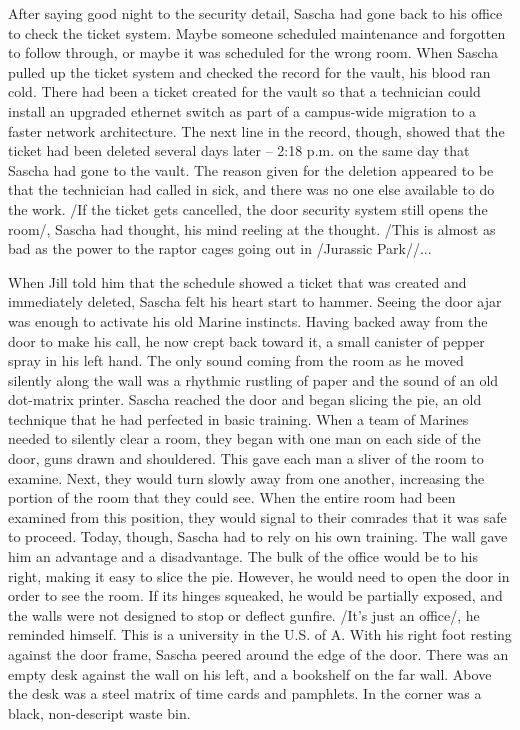 After saying good night to the security detail, Sascha had gone back to his office to check the ticket system.  Maybe someone scheduled maintenance and forgotten to follow through, or maybe it was scheduled for the wrong room.  When Sascha pulled up the ticket system and checked the record for the vault, his blood ran cold.  There had been a ticket created for the vault so that a technician could install an upgraded ethernet switch as part of a campus-wide migration to a faster network architecture.  The next line in the record, though, showed that the ticket had been deleted several days later -- 2:18 p.m. on the same day that Sascha had gone to the vault.  The reason given for the deletion appeared to be that the technician had called in sick, and there was no one else available to do the work.  /If the ticket gets cancelled, the door security system still opens the room/, Sascha had thought, his mind reeling at the thought.  /This is almost as bad as the power to the raptor cages going out in /Jurassic Park//...

When Jill told him that the schedule showed a ticket that was created and immediately deleted, Sascha felt his heart start to hammer.  Seeing the door ajar was enough to activate his old Marine instincts.  Having backed away from the door to make his call, he now crept back toward it, a small canister of pepper spray in his left hand.  The only sound coming from the room as he moved silently along the wall was a rhythmic rustling of paper and the sound of an old dot-matrix printer.  Sascha reached the door and began slicing the pie, an old technique that he had perfected in basic training.  When a team of Marines needed to silently clear a room, they began with one man on each side of the door, guns drawn and shouldered.  This gave each man a sliver of the room to examine.  Next, they would turn slowly away from one another, increasing the portion of the room that they could see.  When the entire room had been examined from this position, they would signal to their comrades that it was safe to proceed.  Today, though, Sascha had to rely on his own training.  The wall gave him an advantage and a disadvantage.  The bulk of the office would be to his right, making it easy to slice the pie.  However, he would need to open the door in order to see the room.  If its hinges squeaked, he would be partially exposed, and the walls were not designed to stop or deflect gunfire.  /It's just an office/, he reminded himself.  This is a university in the U.S. of A.  With his right foot resting against the door frame, Sascha peered around the edge of the door.  There was an empty desk against the wall on his left, and a bookshelf on the far wall.  Above the desk was a steel matrix of time cards and pamphlets.  In the corner was a black, non-descript waste bin.


